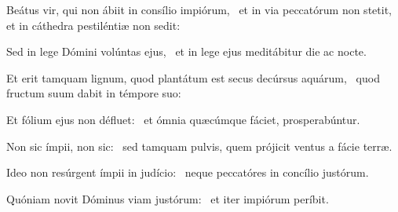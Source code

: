 \item Beátus vir, qui non ábiit in consílio impiórum,~\pscross{} et in via peccatórum non stetit,~\psstar{} et in cáthedra pestiléntiæ non sedit:

\item Sed in lege Dómini volúntas ejus,~\psstar{} et in lege ejus meditábitur die ac nocte.

\item Et erit tamquam lignum, quod plantátum est secus decúrsus aquárum,~\psstar{} quod fructum suum dabit in témpore suo:

\item Et fólium ejus non défluet:~\psstar{} et ómnia quæcúmque fáciet, prosperabúntur.

\item Non sic ímpii, non sic:~\psstar{} sed tamquam pulvis, quem prójicit ventus a fácie terræ.

\item Ideo non resúrgent ímpii in judício:~\psstar{} neque peccatóres in concílio justórum.

\item Quóniam novit Dóminus viam justórum:~\psstar{} et iter impiórum períbit.
